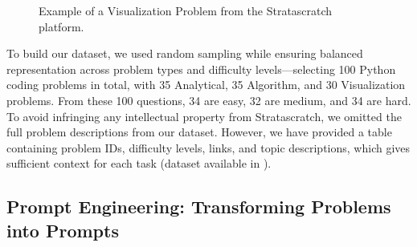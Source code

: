 \documentclass[conference]{IEEEtran}
\begin{document}
\begin{figure}[H] 
\centering 
{} \caption{Example of a Visualization Problem from the Stratascratch platform.} 
\label{fig:strata} 
\end{figure}

To build our dataset, we used random sampling while ensuring balanced representation across problem types and difficulty levels—selecting 100 Python coding problems in total, with 35 Analytical, 35 Algorithm, and 30 Visualization problems. From these 100 questions, 34 are easy, 32 are medium, and 34 are hard. 
To avoid infringing any intellectual property from Stratascratch, we omitted the full problem descriptions from our dataset. However, we have provided a table containing problem IDs, difficulty levels, links, and topic descriptions, which gives sufficient context for each task (dataset available in \cite{EASER_LLM4Code_Study4_2023}).



\subsection{Prompt Engineering: Transforming Problems into Prompts} \label{sub:prompt}
\end{document}
